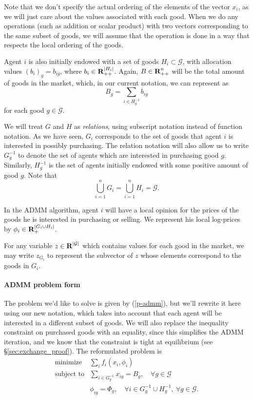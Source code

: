 \documentclass[12pt]{article}
\begin{document}
Note that we don't specify the actual ordering of the elements
of the vector $x_i$, as we will just care about the values associated with
each good.
When we do any operations (such as addition or scalar product) with
two vectors corresponding to the same subset of goods, we will
assume that the operation is done in a way that respects the local ordering of
the goods.

Agent $i$ is also initially endowed with a set of goods
$H_i \subset \mathcal{G}$,
with allocation values $(b_i)_g = b_{ig}$, where $b_i \in {\mbox{\bf R}}_{++}^{|H_i|}$.
Again, $B \in {\mbox{\bf R}}^n_{++}$ will be the total amount of goods in the market,
which, in our current notation, we can represent as
\[
B_g = \sum\limits_{i \in H^{-1}_g} b_{ig}
\]
for each good $g \in \mathcal{G}$.

We will treat $G$ and $H$ as \emph{relations}, using subscript notation instead
of function notation. As we have seen, $G_i$ corresponds to the set of goods
that agent $i$ is interested in possibly purchasing. The relation notation will
also allow us to write $G^{-1}_g$ to denote the set of agents which are
interested in purchasing good $g$. Similarly, $H^{-1}_g$ is the set of agents
initially endowed with some positive amount of good $g$. Note that
\[
\bigcup_{i=1}^n G_i = \bigcup_{i=1}^n H_i = \mathcal{G}.
\]

In the ADMM algorithm, agent $i$ will have a local opinion for the prices
of the goods he is interested in purchasing or selling.
We represent his local log-prices
by $\phi_i \in {\mbox{\bf R}}_+^{|G_i \cup H_i|}$.



For any variable $z \in {\mbox{\bf R}}^{|\mathcal{G}|}$ which contains values for
each good in the market, we may write $z_{G_i}$ to represent the subvector
of $z$ whose elements correspond to the goods in $G_i$.

\paragraph{ADMM problem form}

The problem we'd like to solve is given by (\ref{p-admm}), but we'll rewrite it
here using our new notation, which takes into account that each agent will be
interested in a different subset of goods. We will also replace the inequality
constraint on purchased goods with an equality, since this simplifies the ADMM
iteration, and we know that the constraint is tight at equilibrium (see
\S\ref{sec:exchange_proof}).
The reformulated problem is
\begin{equation}
\begin{array}{ll}
\mbox{minimize} & \sum_i f_i(x_i, \phi_i) \\
\mbox{subject to} & \sum\limits_{i \in G^{-1}_g} x_{ig} = B_g,\quad \forall g \in \mathcal{G}\\
& \phi_{ig} = \Phi_g,\quad \forall i \in G^{-1}_g \cup H^{-1}_g,\ \forall g \in \mathcal{G}.
\end{array}
\label{p-admm2}
\end{equation}
\end{document}
